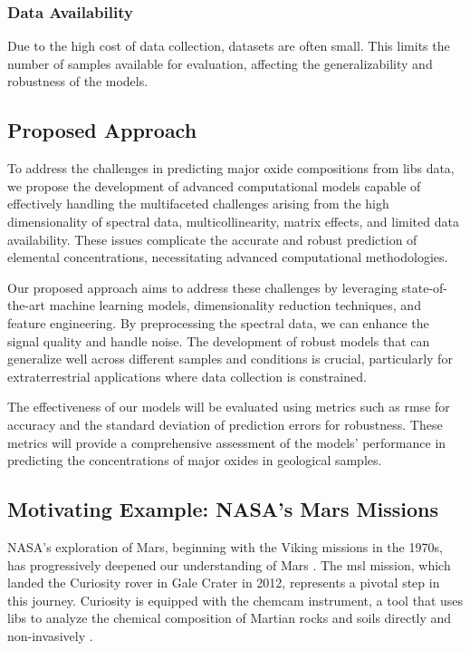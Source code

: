 \subsubsection{Data Availability}
Due to the high cost of data collection, datasets are often small. This limits the number of samples available for evaluation, affecting the generalizability and robustness of the models\cite{p9_paper}.

\subsection{Proposed Approach}
To address the challenges in predicting major oxide compositions from \gls{libs} data, we propose the development of advanced computational models capable of effectively handling the multifaceted challenges arising from the high dimensionality of spectral data, multicollinearity, matrix effects, and limited data availability.
These issues complicate the accurate and robust prediction of elemental concentrations, necessitating advanced computational methodologies. 

Our proposed approach aims to address these challenges by leveraging state-of-the-art machine learning models, dimensionality reduction techniques, and feature engineering.
By preprocessing the spectral data, we can enhance the signal quality and handle noise.
The development of robust models that can generalize well across different samples and conditions is crucial, particularly for extraterrestrial applications where data collection is constrained.

The effectiveness of our models will be evaluated using metrics such as \gls{rmse} for accuracy and the standard deviation of prediction errors for robustness.
These metrics will provide a comprehensive assessment of the models' performance in predicting the concentrations of major oxides in geological samples.

\subsection{Motivating Example: NASA's Mars Missions}
NASA's exploration of Mars, beginning with the Viking missions in the 1970s, has progressively deepened our understanding of Mars \cite{marsnasagov_vikings}.
The \gls{msl} mission, which landed the Curiosity rover in Gale Crater in 2012, represents a pivotal step in this journey.
Curiosity is equipped with the \gls{chemcam} instrument, a tool that uses \gls{libs} to analyze the chemical composition of Martian rocks and soils directly and non-invasively \cite{chemcamNasaWebsite}.

